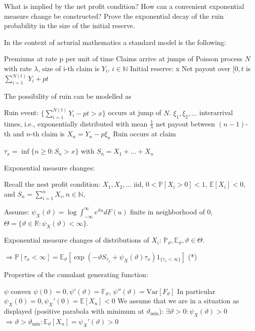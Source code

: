 What is implied by the net profit
condition? How can a convenient exponential measure change be constructed?
Prove the exponential decay of the ruin probability in the size of the initial reserve.

In the context of acturial mathematics a standard model is the following:

Premiums at rate p per unit of time
Claims arrive at jumps of Poisson process \( N \) with rate \( \lambda \), size of i-th claim is \( Y_i \), \( i \in \mathbb{N} \)
Initial reserve: x
Net payout over \( [0, t \) is \( \sum_{i=1}^{N(t)} Y_i + pt \)

The possibility of ruin can be modelled as 

Ruin event: \( \{ \sum_{i=1}^{N(t)} Y_i - pt > x \} \) occurs at jump of \( N \).
\( \xi_1, \xi_2, \dots \) interarrival times, i.e., exponentially distributed with mean \( \frac{1}{\lambda} \)
net payout between \( (n-1) \)-th and \( n \)-th claim is \( X_n = Y_n - p \xi_n \)
Ruin occurs at claim

\( \tau_x = \inf \{ n \ge 0 : S_n > x \} \)
with \( S_n = X_1 + \dots + X_n \)

Exponential measure changes:

Recall the nest profit condition: 
\( X_1, X_2, \dots \) iid, \(0 < \mathbb{P}[X_i > 0] < 1\), \( \mathbb{E}[X_i] < 0 \),
and \( S_n = \sum_{i=1}^n X_i, n \in \mathbb{N} \),

Assume: \( \psi_X(\vartheta) = \log \int_{-\infty}^\infty e^{\vartheta u} dF(u) \) finite in neighborhood of 0, \( \Theta = \{ \vartheta \in \mathbb{R} : \psi_X(\vartheta) < \infty \} \).

Exponential measure changes of distributions of \( X_i \): \( \mathbb{P}_\vartheta, \mathbb{E}_\vartheta, \vartheta \in \Theta \).

\( \Rightarrow \mathbb{P}[\tau_x < \infty] = \mathbb{E}_\vartheta [\exp(-\vartheta S_{\tau_x} + \psi_X (\vartheta) \tau_x) 1_{\{\tau_x < \infty\}}] \) (*)

Properties of the cumulant generating function:

\( \psi \) convex \( \psi(0) = 0, \psi'(\vartheta) = \mathbb{F_{\vartheta}} \), \( \psi''(\vartheta) = \text{Var}[F_\vartheta] \)
In particular \(  \psi_X(0) = 0, \psi_X'(0) = \mathbb{E}[X_n] < 0 \)
We assume that we are in a situation as displayed (positive parabola with minimum at \( \vartheta_{\text{min}} \)): 
\( \exists \vartheta > 0: \psi_X (\vartheta) > 0 \)
\( \Rightarrow \vartheta > \vartheta_{\min}: \mathbb{E}_\vartheta[X_n] = \psi_X'(\vartheta) > 0 \)

